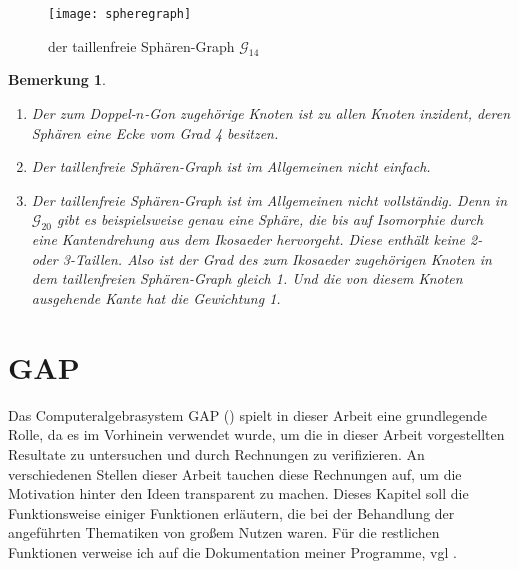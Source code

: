 \documentclass[12pt,titlepage,twoside,cleardoublepage]{article}
\theoremstyle{nummermitklammern}
\newtheorem{bemerkung}[temp]{Bemerkung}
\newtheorem{bemerkung}[zahl]{Bemerkung}
\numberwithin{equation}{section}
\begin{document}
 \begin{figure}[H]
\begin{center}
\texttt{[image: spheregraph]}
\end{center}
\caption{der taillenfreie Sphären-Graph $\mathcal{G}_{14}$}
\end{figure}
 \begin{bemerkung}
 \begin{enumerate}
 \item Der zum Doppel-$n$-Gon zugehörige Knoten ist zu allen Knoten inzident, deren Sphären eine Ecke vom Grad 4 besitzen.
 \item Der taillenfreie Sphären-Graph ist im Allgemeinen nicht einfach.
 \item Der taillenfreie Sphären-Graph ist im Allgemeinen nicht vollständig. Denn in $\mathcal{G}_{20}$ gibt es beispielsweise genau eine Sphäre, die bis auf Isomorphie durch eine Kantendrehung aus dem Ikosaeder hervorgeht. Diese enthält keine 2- oder 3-Taillen. Also ist der Grad des zum Ikosaeder zugehörigen Knoten in dem taillenfreien Sphären-Graph gleich 1. Und die von diesem Knoten ausgehende Kante hat die Gewichtung 1.
 \end{enumerate}
 \end{bemerkung}
\newpage
\section{GAP}
Das Computeralgebrasystem GAP (\cite{gap}) spielt in dieser Arbeit eine grundlegende Rolle, da es im Vorhinein verwendet wurde, um die in dieser Arbeit vorgestellten Resultate zu untersuchen und durch Rechnungen zu verifizieren. 
An verschiedenen Stellen dieser Arbeit tauchen diese Rechnungen auf, um die Motivation hinter den Ideen transparent zu machen.
 Dieses Kapitel soll die Funktionsweise einiger Funktionen erläutern, die bei der Behandlung der angeführten Thematiken von großem Nutzen waren. Für die restlichen Funktionen verweise ich auf die Dokumentation meiner Programme, vgl \cite{reygap}.
\end{document}
